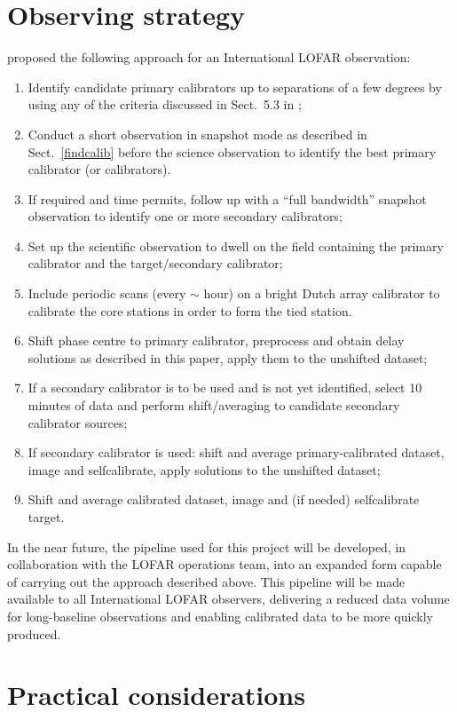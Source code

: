 \documentclass[graybox]{svmult}
\begin{document}
\section{Observing strategy}
\cite{moldon15} proposed the following approach for an International LOFAR observation: 
\begin{enumerate}
\item Identify candidate primary calibrators up to separations of a few degrees 
    by using any of the criteria discussed in Sect.~5.3 in
    \cite{moldon15};
\item Conduct a short observation in snapshot mode as described
in Sect.~\ref{findcalib} before the science observation to identify
the best primary calibrator (or calibrators).
\item If required and time permits, follow up with a ``full bandwidth'' snapshot observation to 
identify one or more secondary calibrators;
\item Set up the scientific observation to dwell on the field 
containing the primary calibrator and the target/secondary calibrator;
\item Include periodic scans (every $\sim$ hour) on a bright Dutch array 
calibrator to calibrate the core stations in order to form the tied station.
\item Shift phase centre to primary calibrator, preprocess and obtain delay solutions 
as described in this paper, apply them to the unshifted dataset;
\item If a secondary calibrator is to be used and is not yet identified, select 10 minutes
of data and perform shift/averaging to candidate secondary calibrator sources;
\item If secondary calibrator is used: shift and average primary-calibrated dataset, 
image and selfcalibrate, apply solutions to the unshifted dataset;
\item Shift and average calibrated dataset, image and (if needed) selfcalibrate target.
\end{enumerate}

In the near future, the pipeline used for this project will be developed, in
collaboration with the LOFAR operations team, into an expanded form capable of
carrying out the approach described above.  This pipeline will be made available
to all International LOFAR observers, delivering a reduced data volume for
long-baseline observations and enabling calibrated data to be more quickly
produced.


\section{Practical considerations}
\label{sec:practical}
\end{document}
